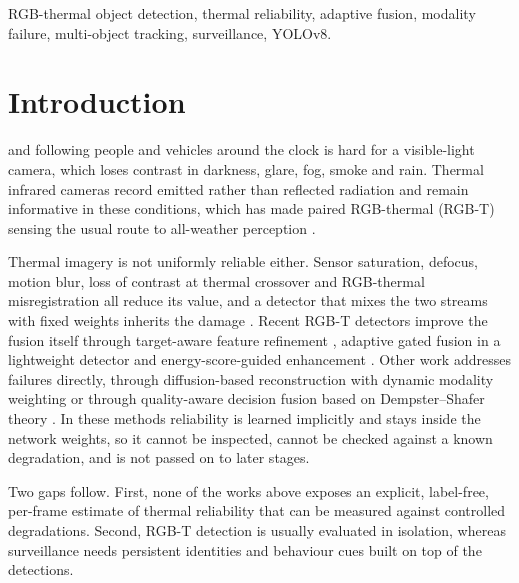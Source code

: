 \documentclass[journal]{IEEEtran}
\begin{document}
\begin{IEEEkeywords}
RGB-thermal object detection, thermal reliability, adaptive fusion, modality failure, multi-object tracking, surveillance, YOLOv8.
\end{IEEEkeywords}

\section{Introduction}\label{sec:intro}
 and following people and vehicles around the clock is hard for a visible-light camera, which loses contrast in darkness, glare, fog, smoke and rain. Thermal infrared cameras record emitted rather than reflected radiation and remain informative in these conditions, which has made paired RGB-thermal (RGB-T) sensing the usual route to all-weather perception \cite{songSurvey,deepFusion}.

Thermal imagery is not uniformly reliable either. Sensor saturation, defocus, motion blur, loss of contrast at thermal crossover and RGB-thermal misregistration all reduce its value, and a detector that mixes the two streams with fixed weights inherits the damage \cite{denet,qdfm}. Recent RGB-T detectors improve the fusion itself through target-aware feature refinement \cite{tfdet}, adaptive gated fusion in a lightweight detector \cite{gemyolo} and energy-score-guided enhancement \cite{eef}. Other work addresses failures directly, through diffusion-based reconstruction with dynamic modality weighting \cite{denet} or through quality-aware decision fusion based on Dempster--Shafer theory \cite{qdfm}. In these methods reliability is learned implicitly and stays inside the network weights, so it cannot be inspected, cannot be checked against a known degradation, and is not passed on to later stages.

Two gaps follow. First, none of the works above exposes an explicit, label-free, per-frame estimate of thermal reliability that can be measured against controlled degradations. Second, RGB-T detection is usually evaluated in isolation, whereas surveillance needs persistent identities and behaviour cues built on top of the detections.
\end{document}
